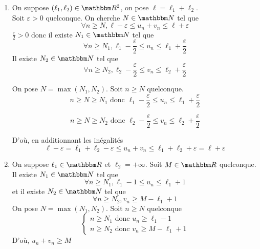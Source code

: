 \begin{prv}
	\begin{enumerate}
		\item On suppose $(\ell_1, \ell_2)\in \R^2$, on pose $\ell = \ell_1+\ell_2$.\\
			Soit $\varepsilon > 0$ quelconque. On cherche $N \in \N$ tel que  \[
			\forall n \ge  N, \ell-\varepsilon\le u_n + v_n\le \ell+\varepsilon
			\]
			$\frac{\varepsilon}{2} > 0$ donc il existe $N_1\in \N$ tel que \[
			\forall n \ge  N_1, \ell_1 - \frac{\varepsilon}{2} \le  u_n \le \ell_1+\frac{\varepsilon}{2}
			\]
			Il existe $N_2\in \N$ tel que \[
			\forall n \ge  N_2, \ell_2 - \frac{\varepsilon}{2} \le v_n \le  \ell_2 + \frac{\varepsilon}{2}
			\]

			On pose $N = \max(N_1,N_2)$. Soit $n \ge N$ quelconque.\[
			n \ge N \ge N_1 \text{ donc } \ell_1-\frac{\varepsilon}{2}\le u_n\le \ell_1+\frac{\varepsilon}{2}
			\]

			\[
			n \ge  N \ge N_2 \text{ donc } \ell_2- \frac{\varepsilon}{2} \le  v_n\le \ell_2+\frac{\varepsilon}{2}
			\] 

			D'où, en additionnant les inégalités \[
			\ell-\varepsilon=\ell_1+\ell_2-\varepsilon \le  u_n + v_n \le  \ell_1+\ell_2+\varepsilon = \ell+\varepsilon
			\]
		\item On suppose $\ell_1 \in \R$ et $\ell_2 = +\infty$. Soit $M \in \R$ quelconque.\\
			Il existe $N_1 \in \N$ tel que \[
			\forall n \ge N_1, \ell_1-1 \le u_n \le  \ell_1+1
			\] et il existe $N_2 \in \N$ tel que \[
			\forall n\ge N_2, v_n \ge M - \ell_1 + 1
			\] On pose $N = \max(N_1, N_2)$. Soit $n \ge N$ quelconque \[
			\begin{cases}
				n \ge N_1 \text{ donc } u_n \ge  \ell_1-1\\
				n \ge N_2 \text{ donc } v_n \ge  M - \ell_1 + 1
			\end{cases}
			\]
			D'où, $u_n+v_n \ge  M$
	\end{enumerate}
\end{prv}


